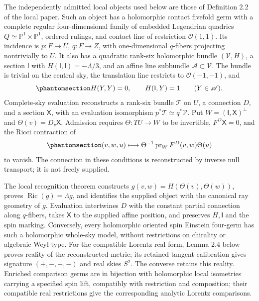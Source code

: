\documentclass[
  english,
  11pt,
  reqno]{amsart}
\begin{document}
The independently admitted local objects used below are those of
Definition 2.2 of the local paper. Such an object has a holomorphic
contact fivefold germ with a complete regular four-dimensional family of
embedded Legendrian quadrics \(Q\simeq\mathbb P^1\times\mathbb P^1\),
ordered rulings, and contact line of restriction \(\mathcal O(1,1)\).
Its incidence is \(p:F\to U\), \(q:F\to Z\), with one-dimensional
\(q\)-fibers projecting nontrivially to \(U\). It also has a quadratic
rank-six holomorphic bundle \((\mathcal V,H)\), a section \(\mathsf I\)
with \(H(\mathsf I,\mathsf I)=-\Lambda/3\), and an affine line subbundle
\(\mathscr A\subset\mathcal V\). The bundle is trivial on the central
sky, the translation line restricts to \(\mathcal O(-1,-1)\), and
\begin{equation}\protect\phantomsection\label{eq:independent-ray-affine-calibration}{
H(Y,Y)=0,
\qquad H(\mathsf I,Y)=1
\qquad(Y\in\mathscr A).
}\end{equation} Complete-sky evaluation reconstructs a rank-six bundle
\(\mathcal T\) on \(U\), a connection \(D\), and a section
\(\mathsf X\), with an evaluation isomorphism
\(p^*\mathcal T\simeq q^*\mathcal V\). Put
\(W=(\mathsf I,\mathsf X)^\perp\) and \(\Theta(v)=D_v\mathsf X\).
Admission requires \(\Theta:TU\to W\) to be invertible,
\(F^D\mathsf X=0\), and the Ricci contraction of
\begin{equation}\protect\phantomsection\label{eq:independent-ray-middle-curvature}{
(v,w,u)\longmapsto
\Theta^{-1}\operatorname{pr}_{W}F^D(v,w)\Theta(u)
}\end{equation} to vanish. The connection in these conditions is
reconstructed by inverse null transport; it is not freely supplied.

The local recognition theorem constructs
\(g(v,w)=H(\Theta(v),\Theta(w))\), proves
\(\operatorname{Ric}(g)=\Lambda g\), and identifies the supplied object
with the canonical ray geometry of \(g\). Evaluation intertwines \(D\)
with the constant partial connection along \(q\)-fibers, takes
\(\mathsf X\) to the supplied affine position, and preserves
\(H,\mathsf I\) and the spin marking. Conversely, every holomorphic
oriented spin Einstein four-germ has such a holomorphic whole-sky model,
without restrictions on chirality or algebraic Weyl type. For the
compatible Lorentz real form, Lemma 2.4 below proves reality of the
reconstructed metric; its retained tangent calibration gives signature
\((+,-,-,-)\) and real skies \(S^2\). The converse retains this reality.
Enriched comparison germs are in bijection with holomorphic local
isometries carrying a specified spin lift, compatibly with restriction
and composition; their compatible real restrictions give the
corresponding analytic Lorentz comparisons.
\end{document}
